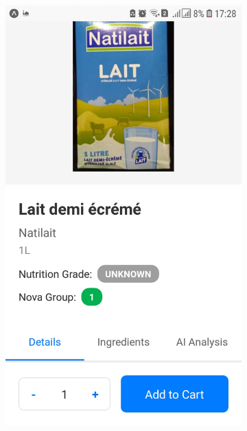 \begin{figure}[h!]
    \centering
    \begin{subfigure}[b]{0.23\textwidth}
        \centering
        \includegraphics[width=\textwidth]{images/natilait1.jpg}
    \end{subfigure}
    \begin{subfigure}[b]{0.23\textwidth}
        \centering

\end{subfigure}
\end{figure}
